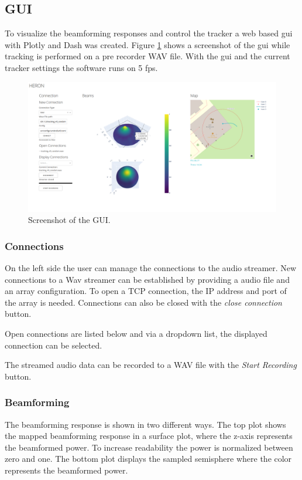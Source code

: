 \subsection{GUI}
To visualize the beamforming responses and control the tracker a web based \acrshort*{gui} with 
Plotly and Dash was created.
Figure \ref*{fin:fig:gui} shows a screenshot of the \acrshort*{gui} while tracking is performed
on a pre recorder WAV file.
With the \acrshort*{gui} and the current tracker settings the software runs on 5 \acrshort{fps}.
\begin{figure}
	\centering
	\includegraphics[width=14.2cm]{images/6_design_final/gui.png}
	\caption{Screenshot of the GUI.}
	\label{fin:fig:gui}
\end{figure}

\subsubsection*{Connections}
On the left side the user can manage the connections to the audio streamer.
New connections to a Wav streamer can be established by providing a audio file
and an array configuration. To open a TCP connection, the IP address and port
of the array is needed.
Connections can also be closed with the \textit{close connection} button.

Open connections are listed below and via a dropdown list, 
the displayed connection can be selected.

The streamed audio data can be recorded to a WAV file with the \textit{Start Recording}
button.

\subsubsection*{Beamforming}
The beamforming response is shown in two different ways.
The top plot shows the mapped beamforming response in a surface plot, where
the z-axis represents the beamformed power.
To increase readability the power is normalized between zero and one.
The bottom plot displays the sampled semisphere where the color 
represents the beamformed power. 

